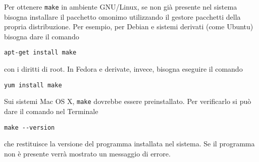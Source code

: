 Per ottenere \verb|make| in ambiente GNU/Linux, se non già presente nel sistema
bisogna installare il pacchetto omonimo utilizzando il gestore pacchetti della
propria distribuzione.  Per esempio, per Debian e sistemi derivati (come Ubuntu)
bisogna dare il comando
\begin{verbatim}
apt-get install make
\end{verbatim}
con i diritti di root.  In Fedora e derivate, invece, bisogna eseguire il
comando
\begin{verbatim}
yum install make
\end{verbatim}

Sui sistemi Mac OS X, \verb|make| dovrebbe essere preinstallato.  Per
verificarlo si può dare il comando nel Terminale
\begin{verbatim}
make --version
\end{verbatim}
che restituisce la versione del programma installata nel sistema.  Se il
programma non è presente verrà mostrato un messaggio di errore.

